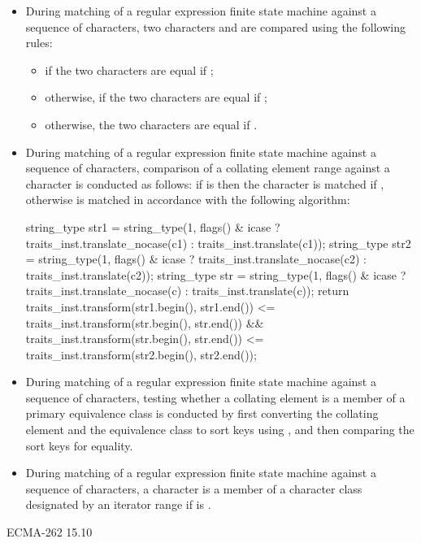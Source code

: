 \begin{itemize}
\item During matching of a regular expression finite state machine
against a sequence of characters, two characters 
and  are compared using the following rules:
\begin{itemize}
\item if  the two characters are equal
if ;
\item otherwise, if  the
two characters are equal if
;
%
\item otherwise, the two characters are equal if .
\end{itemize}

\item During matching of a regular expression finite state machine
against a sequence of characters, comparison of a collating element
range  against a character  is
conducted as follows: if 
is  then the character  is matched if , otherwise  is matched in
accordance with the following algorithm:
\begin{codeblock}
string_type str1 = string_type(1,
  flags() & icase ?
    traits_inst.translate_nocase(c1) : traits_inst.translate(c1));
string_type str2 = string_type(1,
  flags() & icase ?
    traits_inst.translate_nocase(c2) : traits_inst.translate(c2));
string_type str = string_type(1,
  flags() & icase ?
    traits_inst.translate_nocase(c) : traits_inst.translate(c));
return traits_inst.transform(str1.begin(), str1.end())
      <= traits_inst.transform(str.begin(), str.end())
  && traits_inst.transform(str.begin(), str.end())
      <= traits_inst.transform(str2.begin(), str2.end());
\end{codeblock}

\item During matching of a regular expression finite state machine against a sequence of
characters, testing whether a collating element is a member of a primary equivalence
class is conducted by first converting the collating element and the equivalence
class to sort keys using , and then comparing the sort
keys for equality.
%
%

\item During matching of a regular expression finite state machine against a sequence
of characters, a character  is a member of a character class designated by an
iterator range  if
 is .
\end{itemize}
\xref ECMA-262 15.10

